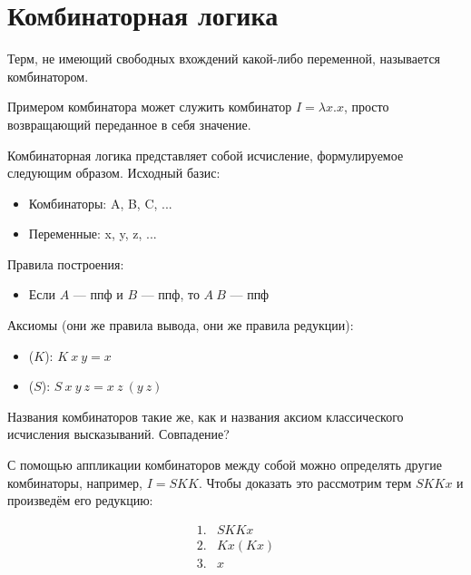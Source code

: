 \section{Комбинаторная логика}

\begin{definition}
    Терм, не имеющий свободных вхождений какой-либо переменной, называется комбинатором.
\end{definition}

Примером комбинатора может служить комбинатор $I = \lambda x. x$, просто возвращающий переданное в себя значение.

Комбинаторная логика представляет собой исчисление, формулируемое следующим образом. Исходный базис:

\begin{itemize}
    \item Комбинаторы: A, B, C, ...
    \item Переменные: x, y, z, ...
\end{itemize}

Правила построения:

\begin{itemize}
    \item Если $A$ --- ппф и $B$ --- ппф, то $A\ B$ --- ппф
\end{itemize}

Аксиомы (они же правила вывода, они же правила редукции):

\begin{itemize}
    \item ($K$): $K\ x \ y = x$
    \item ($S$): $S\ x\ y\ z = x\ z\ (y\ z)$
\end{itemize}

\begin{remark}
    Названия комбинаторов такие же, как и названия аксиом классического исчисления высказываний. Совпадение?
\end{remark}

С помощью аппликации комбинаторов между собой можно определять другие комбинаторы, например, $I=SKK$. Чтобы доказать это рассмотрим терм $SKKx$ и произведём его редукцию:

\begin{equation*}
    \begin{matrix}
        1. & SKKx \\
        2. & Kx(Kx) \\
        3. & x
    \end{matrix}
\end{equation*}
